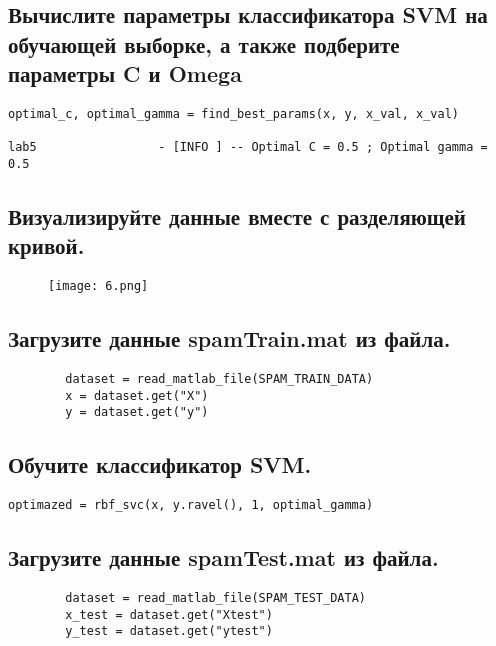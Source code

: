 \subsection{Вычислите параметры классификатора SVM на обучающей выборке, а также подберите параметры C и Omega}

\begin{lstlisting}
optimal_c, optimal_gamma = find_best_params(x, y, x_val, x_val)

lab5                 - [INFO ] -- Optimal C = 0.5 ; Optimal gamma = 0.5
\end{lstlisting}

\subsection{Визуализируйте данные вместе с разделяющей кривой.}

\begin{figure}[h]
\centering
    \texttt{[image: 6.png]}
    \label{sec:purpose:payings}
\end{figure}

\subsection{Загрузите данные spamTrain.mat из файла.}

\begin{lstlisting}
        dataset = read_matlab_file(SPAM_TRAIN_DATA)
        x = dataset.get("X")
        y = dataset.get("y")
\end{lstlisting}

\subsection{Обучите классификатор SVM.}

\begin{lstlisting}
optimazed = rbf_svc(x, y.ravel(), 1, optimal_gamma)
\end{lstlisting}

\subsection{Загрузите данные spamTest.mat из файла.}

\begin{lstlisting}
        dataset = read_matlab_file(SPAM_TEST_DATA)
        x_test = dataset.get("Xtest")
        y_test = dataset.get("ytest")
\end{lstlisting}

